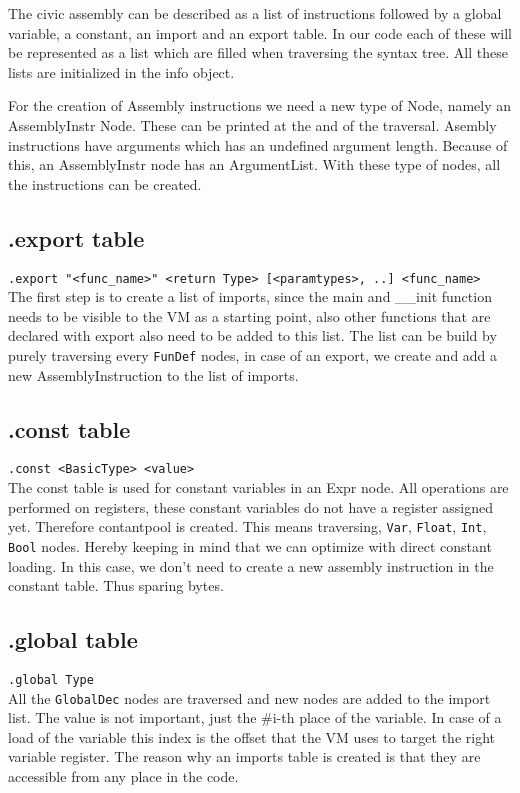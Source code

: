 \documentclass[a4paper]{article}
\begin{document}
The civic assembly can be described as a list of instructions followed by
a global variable, a constant, an import and an export table. In our code each
of these will be represented as a list which are filled when traversing the
syntax tree. All these lists are initialized in the info object.

For the creation of Assembly instructions we need a new type of Node, namely an
AssemblyInstr Node. These can be printed at the and of the traversal.
Asembly instructions have arguments which has an undefined argument length.
Because of this, an AssemblyInstr node has an ArgumentList. With these type of
nodes, all the instructions can be created.

\subsection{.export table}
\texttt{.export "<func\_name>" <return Type> [<paramtypes>, ..] <func\_name>} \\
The first step is to create a list of imports, since the main and \_\_init function
needs to be visible to the VM as a starting point, also other functions that are
declared with export also need to be added to this list. The list can be build
by purely traversing every \texttt{FunDef} nodes, in case of an export, we
create and add a new AssemblyInstruction to the list of imports.

\subsection{.const table}
\texttt{.const <BasicType> <value>} \\
The const table is used for constant variables in an Expr node. All operations
are performed on registers, these constant variables do not have a register
assigned yet. Therefore contantpool is created. This means traversing,
\texttt{Var}, \texttt{Float}, \texttt{Int}, \texttt{Bool} nodes. Hereby keeping
in mind that we can optimize with direct constant loading. In this case, we
don't need to create a new assembly instruction in the constant table. Thus
sparing bytes.

\subsection{.global table}
\texttt{.global Type}\\
All the \texttt{GlobalDec} nodes are traversed and new nodes are added to the import
list. The value is not important, just the \#i-th place of the variable. In case
of a load of the variable this index is the offset that the VM uses to target
the right variable register. The reason why an imports table is created is that
they are accessible from any place in the code.
\end{document}
